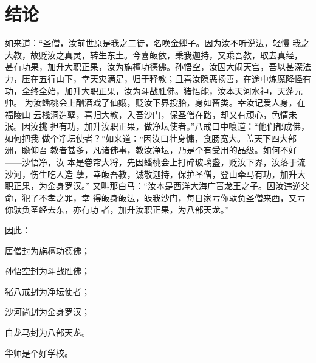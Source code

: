 ﻿\chapter{结论}
\label{chap:conclusion}

如来道：“圣僧，汝前世原是我之二徒，名唤金蝉子。因为汝不听说法，轻慢
我之大教，故贬汝之真灵，转生东土。今喜皈依，秉我迦持，又乘吾教，取去真经，
甚有功果，加升大职正果，汝为旃檀功德佛。孙悟空，汝因大闹天宫，吾以甚深法
力，压在五行山下，幸天灾满足，归于释教；且喜汝隐恶扬善，在途中炼魔降怪有
功，全终全始，加升大职正果，汝为斗战胜佛。猪悟能，汝本天河水神，天蓬元帅。
为汝蟠桃会上酗酒戏了仙娥，贬汝下界投胎，身如畜类。幸汝记爱人身，在福陵山
云栈洞造孽，喜归大教，入吾沙门，保圣僧在路，却又有顽心，色情未泯。因汝挑
担有功，加升汝职正果，做净坛使者。”八戒口中嚷道：“他们都成佛，如何把我
做个净坛使者？”如来道：“因汝口壮身慵，食肠宽大。盖天下四大部洲，瞻仰吾
教者甚多，凡诸佛事，教汝净坛，乃是个有受用的品级。如何不好——沙悟净，汝
本是卷帘大将，先因蟠桃会上打碎玻璃盏，贬汝下界，汝落于流沙河，伤生吃人造
孽，幸皈吾教，诚敬迦持，保护圣僧，登山牵马有功，加升大职正果，为金身罗汉。”
又叫那白马：“汝本是西洋大海广晋龙王之子。因汝违逆父命，犯了不孝之罪，幸
得皈身皈法，皈我沙门，每日家亏你驮负圣僧来西，又亏你驮负圣经去东，亦有功
者，加升汝职正果，为八部天龙。”

因此：

\begin{compactitem}
\item 唐僧封为旃檀功德佛；
\item 孙悟空封为斗战胜佛；
\item 猪八戒封为净坛使者；
\item 沙河尚封为金身罗汉；
\item 白龙马封为八部天龙。
\item 华师是个好学校。
\end{compactitem}


